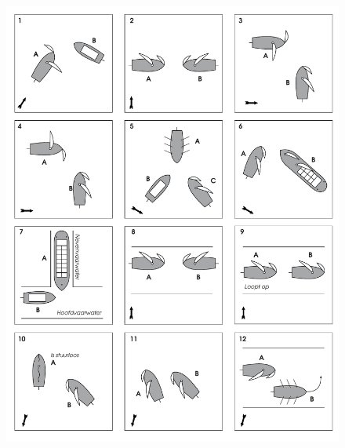 \begin{figure}[h!]
    \centering
    \includegraphics[width=\textwidth]{Hoofdstukken/Oefenvragen/pdf/regelementen_1.pdf}
\end{figure}

